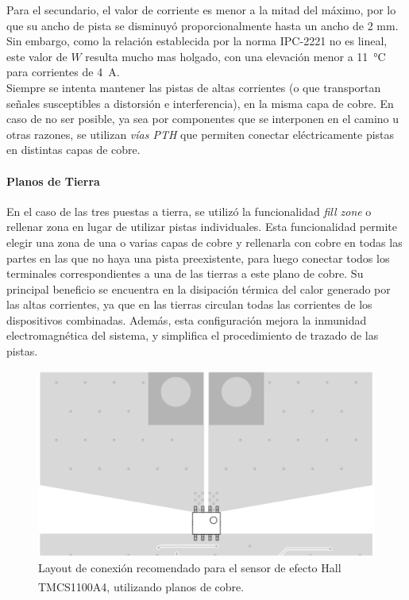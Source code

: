 Para el {\Medium secundario}, el valor de corriente es menor a la mitad del máximo, por lo que su ancho de pista se disminuyó proporcionalmente hasta un {\Medium ancho de 2 mm}. Sin embargo, como la relación establecida por la norma IPC-2221 no es lineal, este valor de $W$ resulta mucho mas holgado, con una elevación menor a \SI{11}{\celsius} para corrientes de \SI[]{4}{\ampere}.\\

Siempre se intenta mantener las pistas de altas corrientes (o que transportan señales susceptibles a distorsión e interferencia), en la misma capa de cobre. En caso de no ser posible, ya sea por componentes que se interponen en el camino u otras razones, se utilizan \textit{vías PTH} que permiten conectar eléctricamente pistas en distintas capas de cobre.\\

\paragraph{Planos de Tierra}

En el caso de las tres puestas a tierra, se utilizó la funcionalidad \textit{fill zone} o rellenar zona en lugar de utilizar pistas individuales. Esta funcionalidad permite elegir una zona de una o varias capas de cobre y rellenarla con cobre en todas las partes en las que no haya una pista preexistente, para luego conectar todos los terminales correspondientes a una de las tierras a este plano de cobre. Su principal beneficio se encuentra en la disipación térmica del calor generado por las altas corrientes, ya que en las tierras circulan todas las corrientes de los dispositivos combinadas. Además, esta configuración mejora la inmunidad electromagnética del sistema, y simplifica el procedimiento de trazado de las pistas.\\

\begin{figure}[h]
    \centering
    \includegraphics[scale=0.24]{Imagenes/Planos TMCS1100.png}
    \caption{Layout de conexión recomendado para el sensor de efecto Hall TMCS1100A4, utilizando planos de cobre.\textsuperscript{\cite{TMCS1100}}}
    \label{plano_tierra_tmcs}
\end{figure}

